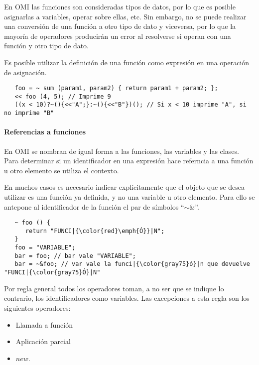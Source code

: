 En OMI las funciones son consideradas tipos de datos, por lo que es posible asignarlas 
a variables, operar sobre ellas, etc. Sin embargo, no se puede realizar una conversión
de una función a otro tipo de dato y viceversa, por lo que la mayoría de operadores producirán 
un error al resolverse si operan con una función y otro tipo de dato.

Es posible utilizar la definición de una función como expresión en una operación de asignación. \\

\begin{lstlisting}
   foo = ~ sum (param1, param2) { return param1 + param2; };
   << foo (4, 5); // Imprime 9
   ((x < 10)?~(){<<"A";}:~(){<<"B"})(); // Si x < 10 imprime "A", si no imprime "B"
\end{lstlisting}

\paragraph{Referencias a funciones }
En OMI se nombran de igual forma a las funciones, las variables y las clases. Para determinar 
si un identificador en una expresión hace referncia a una función u otro elemento se utiliza 
el contexto. 

En muchos casos es necesario indicar explícitamente que el objeto que se desea utilizar es una 
función ya definida, y no una variable u otro elemento. Para ello se antepone al identificador 
de la función el par de símbolos ``$\sim\&$''. \\




\begin{lstlisting}
   ~ foo () {
      return "FUNCI|{\color{red}\emph{Ó}}|N";
   }
   foo = "VARIABLE";
   bar = foo; // bar vale "VARIABLE";
   bar = ~&foo; // var vale la funci|{\color{gray75}ó}|n que devuelve "FUNCI|{\color{gray75}Ó}|N" 
\end{lstlisting}

Por regla general todos los operadores toman, a no ser que se indique lo contrario, 
los identificadores como variables. Las excepciones a esta regla son los 
siguientes operadores:

\begin {itemize}
   \item Llamada a función 
   \item Aplicación parcial
   \item $new$.
\end{itemize}

